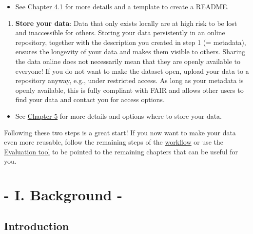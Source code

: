\documentclass[
  oneside]{book}
\providecommand{\tightlist}{%
  \setlength{\itemsep}{0pt}\setlength{\parskip}{0pt}}
\begin{document}
\begin{itemize}
\tightlist
\item
  See \hyperref[describe-data]{Chapter 4.1} for more details and a template to create a README.
\end{itemize}

\begin{enumerate}
\def\labelenumi{\arabic{enumi}.}
\setcounter{enumi}{1}
\tightlist
\item
  \textbf{Store your data}: Data that only exists locally are at high risk to be lost and inaccessible for others. Storing your data persistently in an online repository, together with the description you created in step 1 (= metadata), ensures the longevity of your data and makes them visible to others. Sharing the data online does not necessarily mean that they are openly available to everyone! If you do not want to make the dataset open, upload your data to a repository anyway, e.g., under restricted access. As long as your metadata is openly available, this is fully compliant with FAIR and allows other users to find your data and contact you for access options.
\end{enumerate}

\begin{itemize}
\tightlist
\item
  See \hyperref[storing-your-data]{Chapter 5} for more details and options where to store your data.
\end{itemize}

\begin{infobox}

Following these two steps is a great start! If you now want to make your data even more reusable, follow the remaining steps of the \hyperref[workflow]{workflow} or use the \hyperref[evaluation]{Evaluation tool} to be pointed to the remaining chapters that can be useful for you.

\end{infobox}

\part*{- I. Background -}\label{part---i.-background--}

\chapter{Introduction}\label{introduction}
\end{document}

